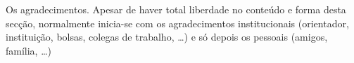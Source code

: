\acknowledgements

Os agradecimentos. Apesar de haver total liberdade no conteúdo e forma desta secção, normalmente inicia-se com os agradecimentos institucionais (orientador, instituição, bolsas, colegas de trabalho, \ldots) e só depois os pessoais (amigos, família, \ldots)
